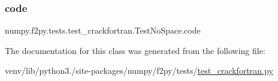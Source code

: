 \subsubsection{\texorpdfstring{code}{code}}
{\footnotesize\ttfamily numpy.\+f2py.\+tests.\+test\+\_\+crackfortran.\+Test\+No\+Space.\+code\hspace{0.3cm}{\ttfamily [static]}}



The documentation for this class was generated from the following file\+:\begin{DoxyCompactItemize}
\item 
venv/lib/python3./site-\/packages/numpy/f2py/tests/\hyperlink{test__crackfortran_8py}{test\+\_\+crackfortran.\+py}\end{DoxyCompactItemize}
